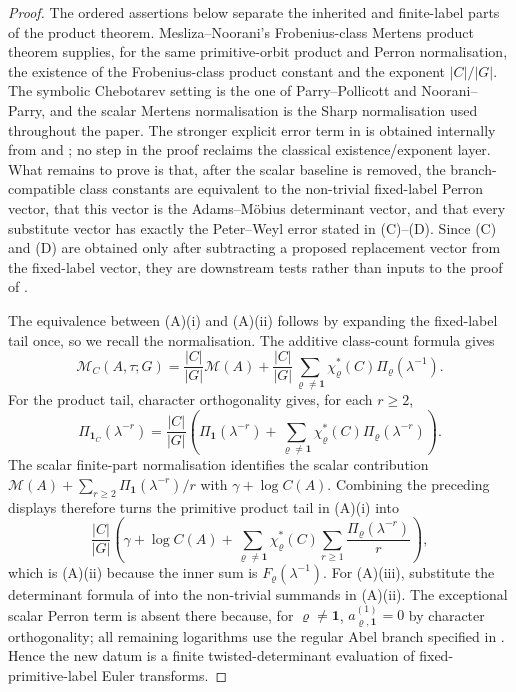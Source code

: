 \documentclass[11pt,a4paper]{amsart}
\theoremstyle{plain}
\theoremstyle{definition}
\theoremstyle{remark}
\begin{document}
\begin{proof}
  The ordered assertions below separate the inherited and finite-label parts
  of the product theorem.  Mesliza--Noorani's Frobenius-class Mertens product
  theorem supplies, for the same primitive-orbit product and Perron
  normalisation, the existence of the Frobenius-class product constant and the
  exponent \(|C|/|G|\).  The symbolic Chebotarev setting is the one of
  Parry--Pollicott and Noorani--Parry, and the scalar Mertens normalisation is
  the Sharp normalisation used throughout the paper.  The stronger explicit
  error term in  is obtained internally
  from  and
  ; no step in the proof reclaims
  the classical existence/exponent layer.  What remains to prove is
  that, after the scalar baseline is removed, the branch-compatible class
  constants are equivalent to the non-trivial fixed-label Perron vector, that
  this vector is the Adams--M\"obius determinant vector, and that every
  substitute vector has exactly the Peter--Weyl error stated in
  \textup{(C)}--\textup{(D)}.  Since \textup{(C)} and \textup{(D)} are obtained
  only after subtracting a proposed replacement vector from the fixed-label
  vector, they are downstream tests rather than inputs to the proof of
  .

  The equivalence between \textup{(A)(i)} and \textup{(A)(ii)} follows by
  expanding the fixed-label tail once, so we recall the normalisation.  The
  additive class-count formula gives
  \[
    \mathcal M_C(A,\tau;G)
    =\frac{|C|}{|G|}\mathcal M(A)
      +\frac{|C|}{|G|}
       \sum_{\varrho\ne\mathbf1}\chi_\varrho^\ast(C)
       \Pi_\varrho(\lambda^{-1}).
  \]
  For the product tail, character orthogonality gives, for each \(r\ge2\),
  \[
    \Pi_{\mathbf1_C}(\lambda^{-r})
    =\frac{|C|}{|G|}
      \left(
        \Pi_{\mathbf1}(\lambda^{-r})
        +\sum_{\varrho\ne\mathbf1}\chi_\varrho^\ast(C)
          \Pi_\varrho(\lambda^{-r})
      \right).
  \]
  The scalar finite-part normalisation identifies the scalar contribution
  \(\mathcal M(A)+\sum_{r\ge2}\Pi_{\mathbf1}(\lambda^{-r})/r\) with
  \(\gamma+\log C(A)\).  Combining the preceding displays therefore turns
  the primitive product tail in \textup{(A)(i)} into
  \[
    \frac{|C|}{|G|}
    \left(
      \gamma+\log C(A)
      +\sum_{\varrho\ne\mathbf1}\chi_\varrho^\ast(C)
        \sum_{r\ge1}\frac{\Pi_\varrho(\lambda^{-r})}{r}
    \right),
  \]
  which is \textup{(A)(ii)} because the inner sum is
  \(F_\varrho(\lambda^{-1})\).  For \textup{(A)(iii)}, substitute the
  determinant formula of  into
  the non-trivial summands in \textup{(A)(ii)}. The exceptional scalar Perron
  term is absent there because, for \(\varrho\neq\mathbf1\),
  \(a_{\varrho,\mathbf1}^{(1)}=0\) by character orthogonality; all remaining
  logarithms use the regular Abel branch specified in
  . Hence the new datum is a finite
  twisted-determinant evaluation of fixed-primitive-label Euler transforms.


\end{proof}
\end{document}
